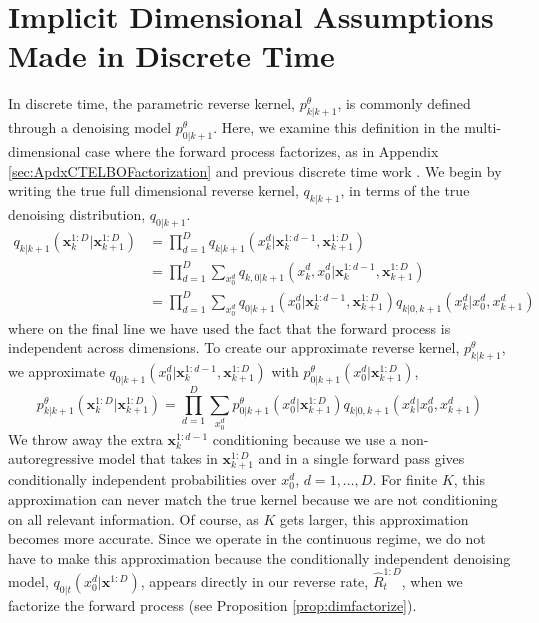 \documentclass{article}
\begin{document}
\section{Implicit Dimensional Assumptions Made in Discrete Time} \label{sec:ApdxDTDimAssumptions}
In discrete time, the parametric reverse kernel, $p_{k|k+1}^\theta$, is commonly defined through a denoising model $p_{0|k+1}^\theta$. Here, we examine this definition in the multi-dimensional case where the forward process factorizes, as in Appendix \ref{sec:ApdxCTELBOFactorization} and previous discrete time work \cite{austin2021structured}. We begin by writing the true full dimensional reverse kernel, $q_{k|k+1}$, in terms of the true denoising distribution, $q_{0|k+1}$.
\begin{align}
    q_{k|k+1}(\bm{x}_{k}^{1:D} | \bm{x}_{k+1}^{1:D}) &= \prod_{d=1}^D q_{k|k+1}(x_{k}^d | \bm{x}_{k}^{1:d-1}, \bm{x}_{k+1}^{1:D})\\
    & = \prod_{d=1}^D \sum_{x_0^d} q_{k,0|k+1}(x_{k}^d, x_0^d | \bm{x}_{k}^{1:d-1}, \bm{x}_{k+1}^{1:D})\\
    & = \prod_{d=1}^D \sum_{x_0^d} q_{0|k+1}(x_0^d | \bm{x}_{k}^{1:d-1}, \bm{x}_{k+1}^{1:D}) q_{k|0, k+1}(x_{k}^d | x_0^d, x_{k+1}^d)
\end{align}
where on the final line we have used the fact that the forward process is independent across dimensions. To create our approximate reverse kernel, $p_{k|k+1}^\theta$, we approximate $q_{0|k+1}(x_0^d | \bm{x}_k^{1:d-1}, \bm{x}_{k+1}^{1:D})$ with $p_{0|k+1}^\theta(x_0^d | \bm{x}_{k+1}^{1:D})$,
\begin{equation}
    p^\theta_{k|k+1}(\bm{x}_{k}^{1:D} | \bm{x}_{k+1}^{1:D}) = \prod_{d=1}^D \sum_{x_0^d} p^\theta_{0|k+1}(x_0^d | \bm{x}_{k+1}^{1:D}) q_{k|0,k+1}(x_{k}^d | x_0^d, x_{k+1}^d)
\end{equation}
We throw away the extra $\bm{x}_k^{1:d-1}$ conditioning because we use a non-autoregressive model that takes in $\bm{x}_{k+1}^{1:D}$ and in a single forward pass gives conditionally independent probabilities over $x_0^d$, $d = 1, \dots, D$. For finite $K$, this approximation can never match the true kernel because we are not conditioning on all relevant information. Of course, as $K$ gets larger, this approximation becomes more accurate. Since we operate in the continuous regime, we do not have to make this approximation because the conditionally independent denoising model, $q_{0|t}(x_0^d | \bm{x}^{1:D})$, appears directly in our reverse rate, $\hat{R}_t^{1:D}$, when we factorize the forward process (see Proposition \ref{prop:dimfactorize}).
\end{document}
